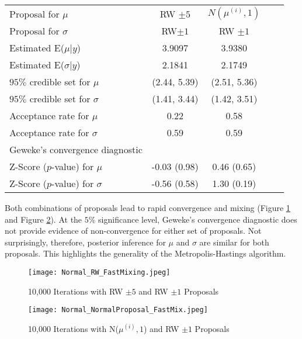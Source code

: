 \documentclass[12pt,openany]{article}
\theoremstyle{remark} %
\theoremstyle{definition} %
\begin{document}
\bigskip
\begin{minipage}{\linewidth}
\centering
{} \label{tab:summary_2parameters} 
\begin{tabular}{lcccc}\toprule[1.5pt]
Proposal for $\mu$ & RW $\pm 5$ & $N(\mu^{(i)},1)$ \\
Proposal for $\sigma$ & RW$\pm 1$ & RW $\pm 1$ \\
\midrule
Estimated E($\mu$|$y$) & 3.9097  & 3.9380\\
Estimated E($\sigma$|$y$)& 2.1841 & 2.1749 \\
\hline
$95\%$ credible set for $\mu$ & (2.44, 5.39) & (2.51, 5.36) \\
$95\%$ credible set for $\sigma$ & (1.41, 3.44) & (1.42, 3.51) \\
\hline
Acceptance rate for $\mu$ & 0.22 & 0.58 \\
Acceptance rate for $\sigma$ & 0.59 & 0.59 \\
\hline
Geweke's convergence diagnostic & ~ & ~ \\
Z-Score ($p$-value) for $\mu$ & -0.03 (0.98) & 0.46 (0.65) \\
Z-Score ($p$-value) for $\sigma$ & -0.56 (0.58) & 1.30 (0.19)\\
\bottomrule[1.5pt]
\end {tabular}\par
\bigskip
\end{minipage}

\bigskip

Both combinations of proposals lead to rapid convergence and mixing (Figure \ref{fig:normalRWFast} and Figure \ref{fig:normalNormalFast}). At the $5\%$ significance level, Geweke's convergence diagnostic does not provide evidence of non-convergence for either set of proposals. Not surprisingly, therefore, posterior inference for $\mu$ and $\sigma$ are similar for both proposals. This highlights the generality of the Metropolis-Hastings algorithm. 

\begin{figure}
\begin{center}\texttt{[image: Normal\_RW\_FastMixing.jpeg]}\end{center}
\caption{10,000 Iterations with RW $\pm 5$ and RW $\pm1$ Proposals} \label{fig:normalRWFast}

\end{figure}

\begin{figure}
\begin{center}\texttt{[image: Normal\_NormalProposal\_FastMix.jpeg]}\end{center}
\caption{10,000 Iterations with N($\mu^{(i)},1$) and RW $\pm1$ Proposals} \label{fig:normalNormalFast}
\end{figure}
\end{document}
